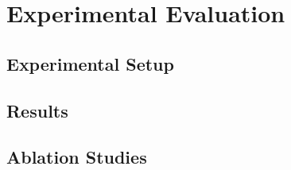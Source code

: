 \chapter{Experimental Evaluation}



\section{Experimental Setup}



\section{Results}



\section{Ablation Studies}


